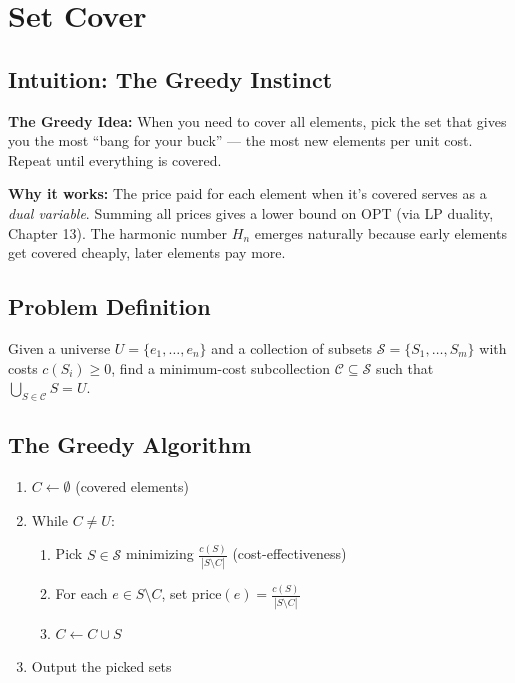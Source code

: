 \setcounter{chapter}{1}
\chapter{Set Cover}
\label{ch:setcover}

\section{Intuition: The Greedy Instinct}

\begin{intuitionbox}
\textbf{The Greedy Idea:} When you need to cover all elements, pick the set that gives you the most ``bang for your buck'' — the most new elements per unit cost. Repeat until everything is covered.

\textbf{Why it works:} The price paid for each element when it's covered serves as a \emph{dual variable}. Summing all prices gives a lower bound on OPT (via LP duality, Chapter 13). The harmonic number $H_n$ emerges naturally because early elements get covered cheaply, later elements pay more.
\end{intuitionbox}

\section{Problem Definition}

\begin{definition}
Given a universe $U = \{e_1, \dots, e_n\}$ and a collection of subsets $\mathcal{S} = \{S_1, \dots, S_m\}$ with costs $c(S_i) \geq 0$, find a minimum-cost subcollection $\mathcal{C} \subseteq \mathcal{S}$ such that $\bigcup_{S \in \mathcal{C}} S = U$.
\end{definition}

\section{The Greedy Algorithm}

\begin{algorithmdef}
\begin{enumerate}
    \item $C \gets \emptyset$ (covered elements)
    \item While $C \neq U$:
    \begin{enumerate}
        \item Pick $S \in \mathcal{S}$ minimizing $\frac{c(S)}{|S \setminus C|}$ (cost-effectiveness)
        \item For each $e \in S \setminus C$, set $\text{price}(e) = \frac{c(S)}{|S \setminus C|}$
        \item $C \gets C \cup S$
    \end{enumerate}
    \item Output the picked sets
\end{enumerate}
\end{algorithmdef}

